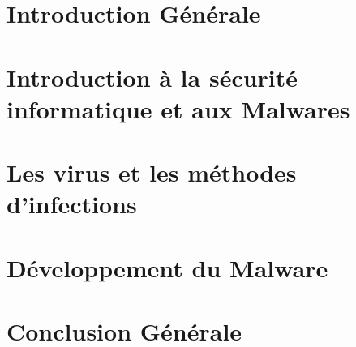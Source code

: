 \documentclass[12pt]{report}
\begin{document}


\renewcommand{\contentsname}{Sommaire}
\tableofcontents
\listoffigures
\listoftables

\chapter*{Introduction Générale}



\chapter{Introduction à la sécurité informatique et aux Malwares}


\chapter{Les virus et les méthodes d'infections}


\chapter{Développement du Malware}


\chapter*{Conclusion Générale}


\appendix



\end{document}
